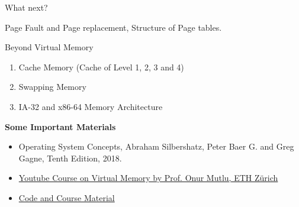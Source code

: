 \documentclass[11pt, table, aspectratio=169]{beamer}
\begin{document}
	\begin{frame}{What next?}
		\begin{block}{}
			\vspace{0.1cm}
			Page Fault and Page replacement, Structure of Page tables.
		\end{block}
	\end{frame}
	\begin{frame}{Beyond Virtual Memory}
		\begin{enumerate}
			\item Cache Memory (Cache of Level 1, 2, 3 and 4)
			\item Swapping Memory 
			\item IA-32 and x86-64 Memory Architecture
		\end{enumerate}
		\begin{block}{\textbf{Some Important Materials}}
			\begin{itemize}
				\item Operating System Concepts, Abraham Silbershatz, Peter Baer G. and Greg Gagne, Tenth Edition, 2018.
				\item \href{https://www.youtube.com/watch?v=3gRBOqf9rRY}{Youtube Course on Virtual Memory by  Prof. Onur Mutlu, ETH Zürich}
				\item \href{https://github.com/lemerleau/VMAT.git}{Code and Course Material}
			\end{itemize}
		\end{block}
	\end{frame}
	
	
\end{document}
